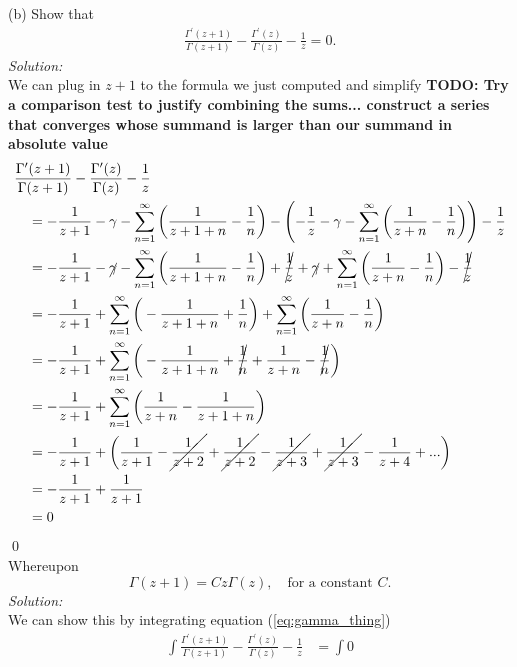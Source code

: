 \documentclass[10pt]{amsart}
\theoremstyle{nonumberplain}
\begin{document}
\begin{enumerate}[label={\bf {\arabic*}:}]
\noindent
(b) Show that
\begin{align}
\frac {\Gamma^\prime(z + 1)} {\Gamma(z + 1)} - \frac {\Gamma^\prime(z)} {\Gamma(z)} - \frac 1 z = 0.
\label{eq:gamma_thing}
\end{align}
\textit{Solution:} \\
We can plug in $z + 1$ to the formula we just computed and simplify
\textbf{TODO: Try a comparison test to justify combining the sums... construct a series that converges whose summand is larger than our summand in absolute value}
\begin{align*}
&\frac {\Gamma^\prime(z + 1)} {\Gamma(z + 1)} - \frac {\Gamma^\prime(z)} {\Gamma(z)} - \frac 1 z \\
	& \quad = - \frac 1 {z + 1} - \gamma - \sum_{n=1}^\infty \bigg( \frac 1 {z + 1 + n} - \frac 1 n \bigg) - \left(- \frac 1 z - \gamma - \sum_{n=1}^\infty \bigg( \frac 1 {z + n} - \frac 1 n \bigg) \right) - \frac 1 z \\
	& \quad = - \frac 1 {z + 1} - \cancel{\gamma} - \sum_{n=1}^\infty \bigg( \frac 1 {z + 1 + n} - \frac 1 n \bigg) + \cancel{\frac 1 z} + \cancel{\gamma} + \sum_{n=1}^\infty \bigg( \frac 1 {z + n} - \frac 1 n \bigg) - \cancel{\frac 1 z} \\
	& \quad = - \frac 1 {z + 1} + \sum_{n=1}^\infty \bigg( - \frac 1 {z + 1 + n} + \frac 1 n \bigg) + \sum_{n=1}^\infty \bigg( \frac 1 {z + n} - \frac 1 n \bigg) \\
	& \quad = - \frac 1 {z + 1} + \sum_{n=1}^\infty \bigg( - \frac 1 {z + 1 + n} + \cancel{\frac 1 n} + \frac 1 {z + n} - \cancel{\frac 1 n} \bigg) \\
	& \quad = - \frac 1 {z + 1} + \sum_{n=1}^\infty \bigg(\frac 1 {z + n}  - \frac 1 {z + 1 + n} \bigg) \\
	& \quad = - \frac 1 {z + 1} + \bigg(\frac 1 {z + 1}  - \cancel{\frac 1 {z + 2}} + \cancel{\frac 1 {z + 2}}  - \cancel{\frac 1 {z + 3}} + \cancel{\frac 1 {z + 3}}  - \frac 1 {z + 4} + ... \bigg) \\
	& \quad = - \frac 1 {z + 1} + \frac 1 {z + 1} \\
	& \quad = 0
\end{align*}
\qed \\
Whereupon
$$ \Gamma(z + 1) = Cz\Gamma(z), \quad \text{for a constant $C$}. $$
\textit{Solution:} \\
We can show this by integrating equation (\ref{eq:gamma_thing})
\begin{align*}
\int \frac {\Gamma^\prime(z + 1)} {\Gamma(z + 1)} - \frac {\Gamma^\prime(z)} {\Gamma(z)} - \frac 1 z &= \int 0 \\

\end{align*}
\end{enumerate}
\end{document}
